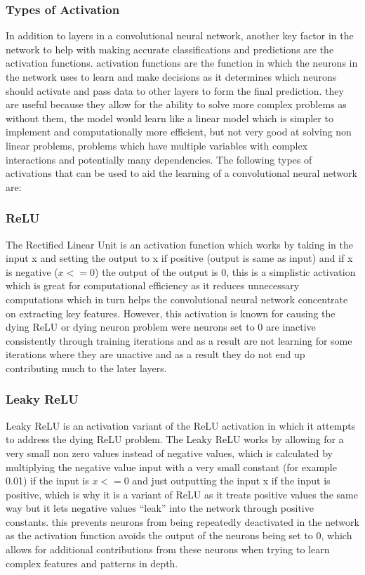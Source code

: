 \documentclass[]{final_report}
\begin{document}
\subsubsection{Types of Activation}

In addition to layers in a convolutional neural network, another key factor in the network to help with making accurate classifications and predictions are the activation functions. activation functions are the function in which the neurons in the network uses to learn and make decisions as it determines which neurons should activate and pass data to other layers to form the final prediction. they are useful because they allow for the ability to solve more complex problems as without them, the model would learn like a linear model which is simpler to implement and computationally more efficient, but not very good at solving non linear problems, problems which have multiple variables with complex interactions and potentially many dependencies. The following types of activations that can be used to aid the learning of a convolutional neural network are:

\subsubsection{ReLU}

The Rectified Linear Unit is an activation function which works by taking in the input x and setting the output to x if positive (output is same as input) and if x is negative ($x<=0$) the output of the output is 0, this is a simplistic activation which is great for computational efficiency as it reduces unnecessary computations which in turn helps the convolutional neural network concentrate on extracting key features. However, this activation is known for causing the dying ReLU or dying neuron problem were neurons set to 0 are inactive consistently through training iterations and as a result are not learning for some iterations where they are unactive and as a result they do not end up contributing much to the later layers.\cite{UpGrad2025}

\subsubsection{Leaky ReLU}

Leaky ReLU is an activation variant of the ReLU activation in which it attempts to address the dying ReLU problem. The Leaky ReLU works by allowing for a very small non zero values instead of negative values, which is calculated by multiplying the negative value input with a very small constant (for example 0.01) if the input is $x<=0$ and just outputting the input x if the input is positive, which is why it is a variant of ReLU as it treats positive values the same way but it lets negative values “leak” into the network through positive constants. this prevents neurons from being repeatedly deactivated in the network as the activation function avoids the output of the neurons being set to 0, which allows for additional contributions from these neurons when trying to learn complex features and patterns in depth.\cite{DataScienceStackExchange2025}
\end{document}
